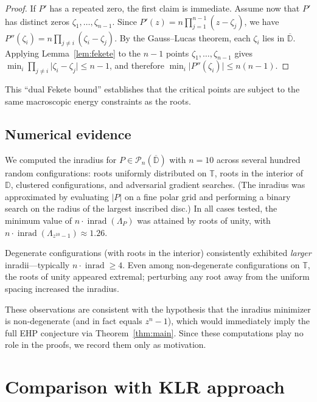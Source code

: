 \documentclass[11pt,a4paper]{amsart}
\theoremstyle{definition}
\newcommand{\D}{\mathbb{D}}
\newcommand{\T}{\mathbb{T}}
\newcommand{\Pn}{\mathcal{P}_n}
\newcommand{\abs}[1]{\lvert #1 \rvert}
\newcommand{\inrad}{\operatorname{inrad}}
\begin{document}
\begin{proof}
If $P'$ has a repeated zero, the first claim is immediate.
Assume now that $P'$ has distinct zeros $\zeta_1, \ldots, \zeta_{n-1}$.
Since $P'(z) = n\prod_{j=1}^{n-1}(z - \zeta_j)$, we have
$P''(\zeta_i) = n\prod_{j \neq i}(\zeta_i - \zeta_j)$.
By the Gauss--Lucas theorem, each $\zeta_i$ lies in $\overline{\D}$.
Applying Lemma~\ref{lem:fekete} to the $n-1$ points
$\zeta_1, \ldots, \zeta_{n-1}$ gives
$\min_i \prod_{j \neq i}\abs{\zeta_i - \zeta_j} \leq n-1$,
and therefore $\min_i \abs{P''(\zeta_i)} \leq n(n-1)$.
\end{proof}

This ``dual Fekete bound'' establishes that the critical points are
subject to the same macroscopic energy constraints as the roots.

\subsection{Numerical evidence}
\label{sec:numerics}

We computed the inradius for
$P \in \Pn(\overline{\D})$ with $n = 10$ across several
hundred random configurations: roots uniformly distributed on $\T$,
roots in the interior of $\D$, clustered configurations, and
adversarial gradient searches.  (The inradius was approximated by
evaluating $\abs{P}$ on a fine polar grid and performing a binary search
on the radius of the largest inscribed disc.)
In all cases tested, the minimum value of
$n \cdot \inrad(\Lambda_P)$ was attained by roots of unity,
with $n \cdot \inrad(\Lambda_{z^{10}-1}) \approx 1.26$.

Degenerate configurations (with roots in the interior) consistently
exhibited \emph{larger} inradii---typically $n \cdot \inrad \geq 4$.
Even among non-degenerate configurations on $\T$, the roots of unity
appeared extremal; perturbing any root away from the uniform spacing
increased the inradius.

These observations are consistent with the hypothesis that the inradius
minimizer is non-degenerate (and in fact equals $z^n - 1$), which would
immediately imply the full EHP conjecture via Theorem~\ref{thm:main}.
Since these computations play no role in the proofs, we record
them only as motivation.

\section{Comparison with KLR approach}
\end{document}
